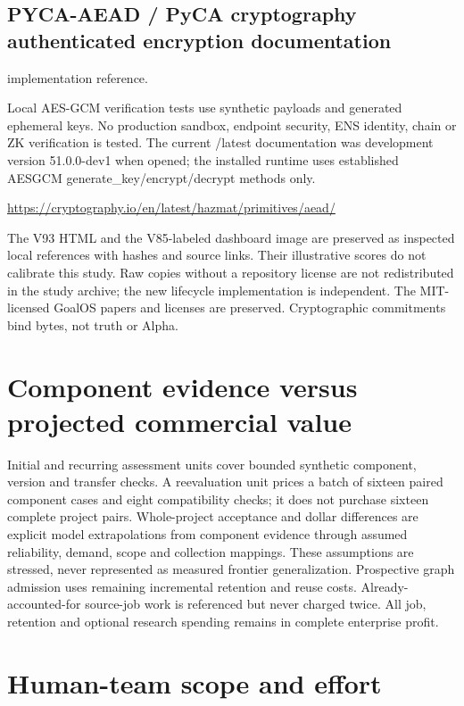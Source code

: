 \documentclass[10pt]{article}
\begin{document}
\subsection*{PYCA-AEAD / PyCA cryptography authenticated encryption documentation}

implementation reference. 

Local AES-GCM verification tests use synthetic payloads and generated ephemeral keys. No production sandbox, endpoint security, ENS identity, chain or ZK verification is tested. The current /latest documentation was development version 51.0.0-dev1 when opened; the installed runtime uses established AESGCM generate\_\allowbreak{}key/encrypt/decrypt methods only.

\url{https://cryptography.io/en/latest/hazmat/primitives/aead/}

The V93 HTML and the V85-labeled dashboard image are preserved as inspected local references with hashes and source links. Their illustrative scores do not calibrate this study. Raw copies without a repository license are not redistributed in the study archive; the new lifecycle implementation is independent. The MIT-licensed GoalOS papers and licenses are preserved. Cryptographic commitments bind bytes, not truth or Alpha.

\section{Component evidence versus projected commercial value}

Initial and recurring assessment units cover bounded synthetic component, version and transfer checks. A reevaluation unit prices a batch of sixteen paired component cases and eight compatibility checks; it does not purchase sixteen complete project pairs. Whole-project acceptance and dollar differences are explicit model extrapolations from component evidence through assumed reliability, demand, scope and collection mappings. These assumptions are stressed, never represented as measured frontier generalization. Prospective graph admission uses remaining incremental retention and reuse costs. Already-accounted-for source-job work is referenced but never charged twice. All job, retention and optional research spending remains in complete enterprise profit.

\section{Human-team scope and effort}
\end{document}
